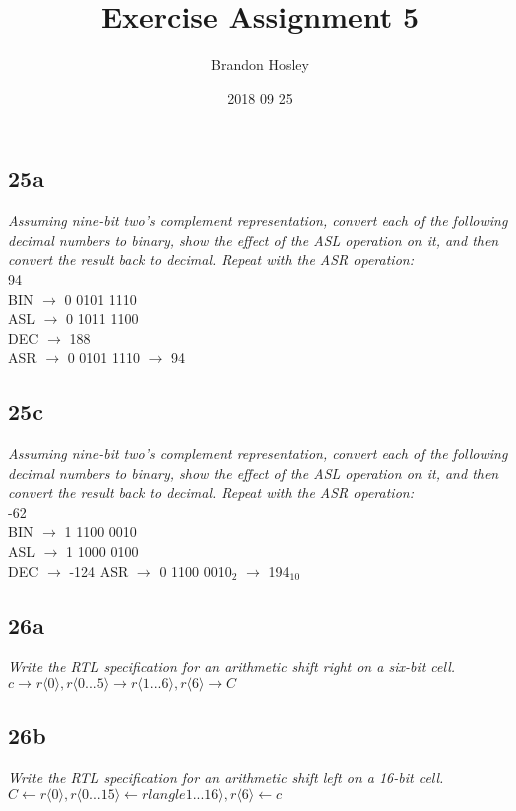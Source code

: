 \documentclass[a4paper,man,natbib]{apa6}
\title{Exercise Assignment 5}
\author{Brandon Hosley}
\date{2018 09 25}
\affiliation{Mike Davis}
\begin{document}
\maketitle
\singlespacing
\subsection{25a}
\emph{Assuming nine-bit two's complement representation, convert each of the following decimal numbers to binary, show the effect of the ASL operation on it, and
	then convert the result back to decimal. Repeat with the ASR operation:} \\
94 \\
BIN $\rightarrow$ 0 0101 1110 \\
ASL $\rightarrow$ 0 1011 1100 \\
DEC $\rightarrow$ 188 \\
ASR $\rightarrow$ 0 0101 1110 $\rightarrow$ 94 \\
\subsection{25c}
\emph{Assuming nine-bit two's complement representation, convert each of the following decimal numbers to binary, show the effect of the ASL operation on it, and
	then convert the result back to decimal. Repeat with the ASR operation:} \\
-62 \\
BIN $\rightarrow$ 1 1100 0010 \\
ASL $\rightarrow$ 1 1000 0100 \\
DEC $\rightarrow$ -124
ASR $\rightarrow$ 0 1100 0010$_{2}$ $\rightarrow$ 194$_{10}$
\subsection{26a}
\emph{Write the RTL specification for an arithmetic shift right on a six-bit cell.} \\
$c\rightarrow r\langle 0\rangle ,r \langle 0...5\rangle\rightarrow r\langle 1...6\rangle ,r\langle 6\rangle\rightarrow C$ \\
\subsection{26b}
\emph{Write the RTL specification for an arithmetic shift left on a 16-bit cell.} \\
$C\leftarrow r\langle 0\rangle ,r \langle 0...15\rangle\leftarrow rlangle 1...16\rangle ,r\langle 6\rangle\leftarrow c$
\end{document}
